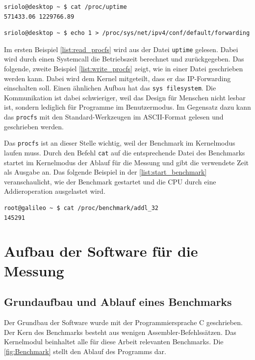 \lstset{language=bash}
\begin{minipage}{\linewidth}
\begin{lstlisting}[label={list:read_procfs},caption={Lesen im procfs}]
sriolo@desktop ~ $ cat /proc/uptime 
571433.06 1229766.89
\end{lstlisting}
\begin{lstlisting}[label={list:write_procfs},caption={Schreiben im procfs}]
sriolo@desktop ~ $ echo 1 > /proc/sys/net/ipv4/conf/default/forwarding
\end{lstlisting}
\end{minipage}


Im ersten Beispiel \autoref{list:read_procfs} wird aus der Datei \texttt{uptime} gelesen. Dabei wird durch einen Systemcall die Betriebszeit berechnet und zurückgegeben. Das folgende, zweite Beispiel \autoref{list:write_procfs} zeigt, wie in einer Datei geschrieben werden kann. Dabei wird dem Kernel mitgeteilt, dass er das IP-Forwarding einschalten soll. Einen ähnlichen Aufbau hat das \texttt{sys filesystem}. Die Kommunikation ist dabei schwieriger, weil das Design für Menschen nicht lesbar ist, sondern lediglich für Programme im Benutzermodus. Im Gegensatz dazu kann das \texttt{procfs} mit den Standard-Werkzeugen im ASCII-Format gelesen und geschrieben werden.
\par
Das \texttt{procfs} ist an dieser Stelle wichtig, weil der Benchmark im Kernelmodus laufen muss. Durch den Befehl \texttt{cat} auf die entsprechende Datei des Benchmarks startet im Kernelmodus der Ablauf für die Messung und gibt die verwendete Zeit als Ausgabe an. Das folgende Beispiel in der \autoref{list:start_benchmark} veranschaulicht, wie der Benchmark gestartet und die CPU durch eine Addieroperation ausgelastet wird.

\lstset{language=bash}
\begin{minipage}{\linewidth}
\begin{lstlisting}[label={list:start_benchmark},caption={Starten des Benchmarks}]
root@galileo ~ $ cat /proc/benchmark/addl_32
145291
\end{lstlisting}
\end{minipage}


\section{Aufbau der Software für die Messung}


\subsection{Grundaufbau und Ablauf eines Benchmarks}
Der Grundbau der Software wurde mit der Programmiersprache C geschrieben. Der Kern des Benchmarks besteht aus wenigen Assembler-Befehlssätzen. Das Kernelmodul beinhaltet alle für diese Arbeit relevanten Benchmarks. Die \autoref{fig:Benchmark} stellt den Ablauf des Programms dar.

